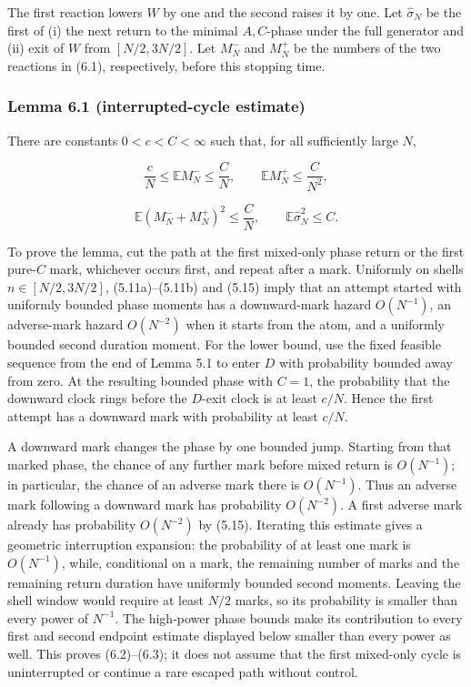 The first reaction lowers \(W\) by one and the second raises it by one.
Let \(\widehat\sigma_N\) be the first of (i) the next return to the
minimal \(A,C\)-phase under the full generator and (ii) exit of \(W\)
from \([N/2,3N/2]\). Let \(M_N^-\) and \(M_N^+\) be the numbers of the
two reactions in (6.1), respectively, before this stopping time.

\subsubsection{Lemma 6.1 (interrupted-cycle
estimate)}

There are constants \(0<c<C<\infty\) such that, for all sufficiently
large \(N\),

\[
 \frac cN\le\mathbb EM_N^-\le\frac CN,\qquad
 \mathbb EM_N^+\le\frac C{N^2},
\tag{6.2}
\]

\[
 \mathbb E(M_N^-+M_N^+)^2\le\frac CN,\qquad
 \mathbb E\widehat\sigma_N^2\le C.
\tag{6.3}
\]

To prove the lemma, cut the path at the first mixed-only phase return or
the first pure-\(C\) mark, whichever occurs first, and repeat after a
mark. Uniformly on shells \(n\in[N/2,3N/2]\), (5.11a)--(5.11b) and
(5.15) imply that an attempt started with uniformly bounded phase
moments has a downward-mark hazard \(O(N^{-1})\), an adverse-mark hazard
\(O(N^{-2})\) when it starts from the atom, and a uniformly bounded
second duration moment. For the lower bound, use the fixed feasible
sequence from the end of Lemma 5.1 to enter \(D\) with probability
bounded away from zero. At the resulting bounded phase with \(C=1\), the
probability that the downward clock rings before the \(D\)-exit clock is
at least \(c/N\). Hence the first attempt has a downward mark with
probability at least \(c/N\).

A downward mark changes the phase by one bounded jump. Starting from
that marked phase, the chance of any further mark before mixed return is
\(O(N^{-1})\); in particular, the chance of an adverse mark there is
\(O(N^{-1})\). Thus an adverse mark following a downward mark has
probability \(O(N^{-2})\). A first adverse mark already has probability
\(O(N^{-2})\) by (5.15). Iterating this estimate gives a geometric
interruption expansion: the probability of at least one mark is
\(O(N^{-1})\), while, conditional on a mark, the remaining number of
marks and the remaining return duration have uniformly bounded second
moments. Leaving the shell window would require at least \(N/2\) marks,
so its probability is smaller than every power of \(N^{-1}\). The
high-power phase bounds make its contribution to every first and second
endpoint estimate displayed below smaller than every power as well. This
proves (6.2)--(6.3); it does not assume that the first mixed-only cycle
is uninterrupted or continue a rare escaped path without control.

